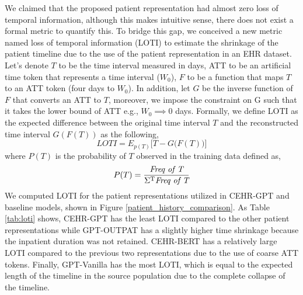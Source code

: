 \begin{multicols}{2}
We claimed that the proposed patient representation had almost zero loss of temporal information, although this makes intuitive sense, there does not exist a formal metric to quantify this. To bridge this gap, we conceived a new metric named loss of temporal information (LOTI) to estimate the shrinkage of the patient timeline due to the use of the patient representation in an EHR dataset. Let's denote $T$ to be the time interval measured in days, ATT to be an artificial time token that represents a time interval (\(W_0\)), $F$ to be a function that maps $T$ to an ATT token (four days to \(W_0\)). In addition, let $G$ be the inverse function of $F$ that converts an ATT to $T$, moreover, we impose the constraint on G such that it takes the lower bound of ATT e.g., \(W_0 \implies 0\) days. Formally, we define LOTI as the expected difference between the original time interval $T$ and the reconstructed time interval $G(F(T))$ as the following,  
\[
  LOTI=E_{p(T)}\Big[T-G\big(F(T)\big)\Big]
\]
where $P(T)$ is the probability of $T$ observed in the training data defined as, 
\[
  P(T)=\frac{\textit{Freq of T}}{\Sigma\textsuperscript{T} \textit{Freq of T}}
\]
We computed LOTI for the patient representations utilized in CEHR-GPT and baseline models, shown in Figure \ref{patient_history_comparison}. As Table \ref{tab:loti} shows, CEHR-GPT has the least LOTI compared to the other patient representations while GPT-OUTPAT has a slightly higher time shrinkage because the inpatient duration was not retained. CEHR-BERT has a relatively large LOTI compared to the previous two representations due to the use of coarse ATT tokens. Finally, GPT-Vanilla has the most LOTI, which is equal to the expected length of the timeline in the source population due to the complete collapse of the timeline. 


\end{multicols}
